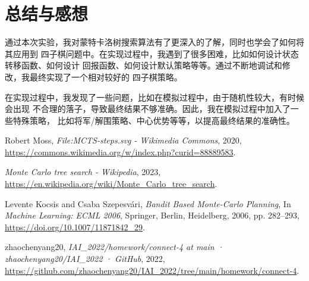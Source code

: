 \documentclass[UTF8]{ctexart}
\begin{document}
\section{总结与感想}

通过本次实验，我对蒙特卡洛树搜索算法有了更深入的了解，同时也学会了如何将其应用到
四子棋问题中。在实现过程中，我遇到了很多困难，比如如何设计状态转移函数、如何设计
回报函数、如何设计默认策略等等。通过不断地调试和修改，我最终实现了一个相对较好的
四子棋策略。

在实现过程中，我发现了一些问题，比如在模拟过程中，由于随机性较大，有时候会出现
不合理的落子，导致最终结果不够准确。因此，我在模拟过程中加入了一些特殊策略，
比如将军/解围策略、中心优势等等，以提高最终结果的准确性。

\begin{thebibliography}{99}
    Robert Moss,
    \emph{File:MCTS-steps.svg - Wikimedia Commons},
    2020,
    \url{https://commons.wikimedia.org/w/index.php?curid=88889583}.
    
    \emph{Monte Carlo tree search - Wikipedia},
    2023,
    \url{https://en.wikipedia.org/wiki/Monte_Carlo_tree_search}.
    
    Levente Kocsis and Csaba Szepesvári,
    \emph{Bandit Based Monte-Carlo Planning},
    In \emph{Machine Learning: ECML 2006},
    Springer, Berlin, Heidelberg, 2006,
    pp. 282--293,
    \url{https://doi.org/10.1007/11871842_29}.
    
    zhaochenyang20,
    \emph{IAI\_2022/homework/connect-4 at main · zhaochenyang20/IAI\_2022 · GitHub},
    2022,
    \url{https://github.com/zhaochenyang20/IAI_2022/tree/main/homework/connect-4}.
\end{thebibliography}
\end{document}
